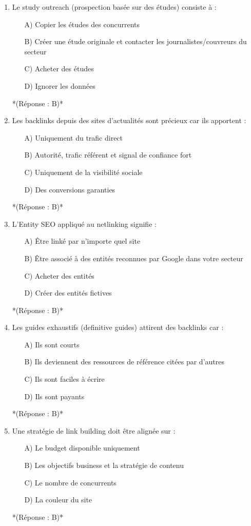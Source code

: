 \documentclass[12pt,a4paper,twoside]{report}
\begin{document}
\begin{enumerate}
\item Le study outreach (prospection basée sur des études) consiste à :
\begin{itemize}
\item[A)] Copier les études des concurrents
\item[B)] Créer une étude originale et contacter les journalistes/couvreurs du secteur
\item[C)] Acheter des études
\item[D)] Ignorer les données
\end{itemize}
*(Réponse : B)*

\item Les backlinks depuis des sites d'actualités sont précieux car ils apportent :
\begin{itemize}
\item[A)] Uniquement du trafic direct
\item[B)] Autorité, trafic référent et signal de confiance fort
\item[C)] Uniquement de la visibilité sociale
\item[D)] Des conversions garanties
\end{itemize}
*(Réponse : B)*

\item L'Entity SEO appliqué au netlinking signifie :
\begin{itemize}
\item[A)] Être linké par n'importe quel site
\item[B)] Être associé à des entités reconnues par Google dans votre secteur
\item[C)] Acheter des entités
\item[D)] Créer des entités fictives
\end{itemize}
*(Réponse : B)*

\item Les guides exhaustifs (definitive guides) attirent des backlinks car :
\begin{itemize}
\item[A)] Ils sont courts
\item[B)] Ils deviennent des ressources de référence citées par d'autres
\item[C)] Ils sont faciles à écrire
\item[D)] Ils sont payants
\end{itemize}
*(Réponse : B)*

\item Une stratégie de link building doit être alignée sur :
\begin{itemize}
\item[A)] Le budget disponible uniquement
\item[B)] Les objectifs business et la stratégie de contenu
\item[C)] Le nombre de concurrents
\item[D)] La couleur du site
\end{itemize}
*(Réponse : B)*


\end{enumerate}
\end{document}
